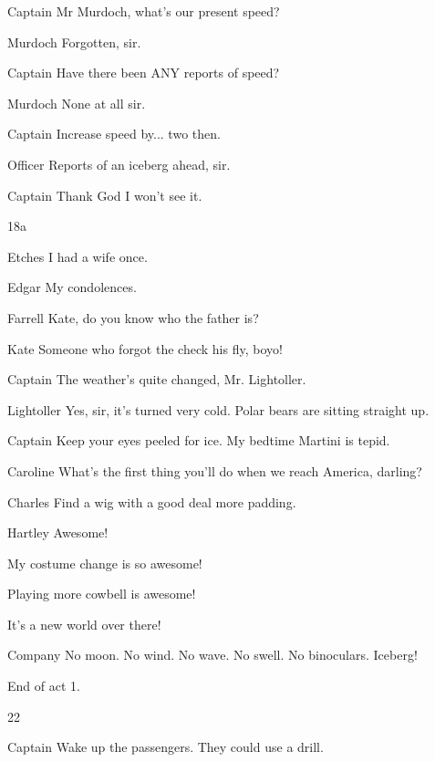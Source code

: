 \documentclass{screenplay}
\newcommand{\captain}[1]{\begin{dialogue}{Captain}#1\end{dialogue}}
\newcommand{\caroline}[1]{\begin{dialogue}{Caroline}#1\end{dialogue}}
\newcommand{\charles}[1]{\begin{dialogue}{Charles}#1\end{dialogue}}
\newcommand{\edgar}[1]{\begin{dialogue}{Edgar}#1\end{dialogue}}
\newcommand{\etches}[1]{\begin{dialogue}{Etches}#1\end{dialogue}}
\newcommand{\farrell}[1]{\begin{dialogue}{Farrell}#1\end{dialogue}}
\newcommand{\hartley}[1]{\begin{dialogue}{Hartley}#1\end{dialogue}}
\newcommand{\kate}[1]{\begin{dialogue}{Kate}#1\end{dialogue}}
\newcommand{\lightoller}[1]{\begin{dialogue}{Lightoller}#1\end{dialogue}}
\newcommand{\murdoch}[1]{\begin{dialogue}{Murdoch}#1\end{dialogue}}
\newcommand{\officer}[1]{\begin{dialogue}{Officer}#1\end{dialogue}}
\newcommand{\company}[1]{\begin{dialogue}{Company}#1\end{dialogue}}
\begin{document}

\captain{
    Mr Murdoch, what's our present speed?
}

\murdoch{
    Forgotten, sir.
}

\captain{
    Have there been ANY reports of speed?
}

\murdoch{
    None at all sir.
}

\captain{
    Increase speed by... two then.
}

\officer{
    Reports of an iceberg ahead, sir.
}

\captain{
    Thank God I won't see it.
}


18a

\etches{
    I had a wife once.
}

\edgar{
    My condolences.
}

\farrell{
    Kate, do you know who the father is?
}

\kate{
    Someone who forgot the check his fly, boyo!
}


\captain{
    The weather's quite changed, Mr. Lightoller.
}

\lightoller{
    Yes, sir, it's turned very cold.
    Polar bears are sitting straight up.
}

\captain{
    Keep your eyes peeled for ice.  My bedtime Martini is tepid.
}


\caroline{
    What's the first thing you'll do when we reach America, darling?
}

\charles{
    Find a wig with a good deal more padding.
}


\hartley{
    Awesome!

    My costume change is so awesome!

    Playing more cowbell is awesome!

    It's a new world over there!
}


\company{
    No moon.  No wind.  No wave.
    No swell.  No binoculars.
    Iceberg!
}

End of act 1.


22

\captain{
    Wake up the passengers.  They could use a drill.
}
\end{document}
